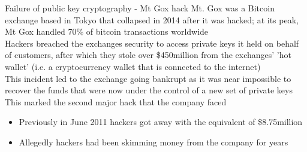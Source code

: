 \documentclass[10pt]{beamer}
\begin{document}




\begin{frame}{Failure of public key cryptography - Mt Gox hack}
	Mt. Gox was a Bitcoin exchange based in Tokyo that collapsed in 2014 after it was hacked; at its peak, Mt Gox handled 70\% of bitcoin transactions worldwide \\ \vspace{2mm}
	Hackers breached the exchanges security to access private keys it held on behalf of customers, after which they stole over \$450million from the exchanges' 'hot wallet' (i.e. a cryptocurrency wallet that is connected to the internet)\\ \vspace{2mm}
	This incident led to the exchange going bankrupt as it was near impossible to recover the funds that were now under the control of a new set of private keys \\ \vspace{2mm}
	This marked the second major hack that the company faced
	\begin{itemize}
		\item Previously in June 2011 hackers got away with the equivalent of \$8.75million
		\item Allegedly hackers had been skimming money from the company for years
	\end{itemize}
\end{frame}
\end{document}
